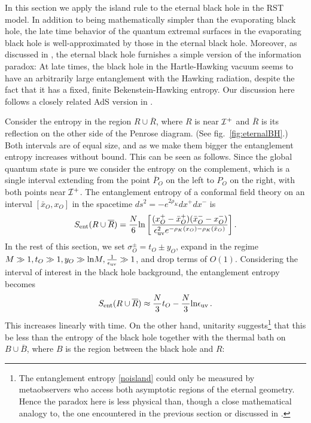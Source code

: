\documentclass[11pt,oneside,letterpaper]{article}
\newcommand{\f}{\frac}
\newcommand{\be}{\begin{equation}}
\newcommand{\ee}{\end{equation}}
\newcommand{\bx}{\bar{x}}
\def\be{\begin{eqnarray}}
\def\ee{\end{eqnarray}}
\let\f=\frac
\def\be{\begin{equation}}
\def\ee{\end{equation}}
\def\euv{\epsilon_{\rm uv}}
\def\log{{\rm ln}}
\numberwithin{equation}{section}
\def \be {\begin{equation}}
\def \ee {\end{equation}}
\begin{document}
In this section we apply the island rule to the eternal black hole in the RST model. In addition to being mathematically simpler than the evaporating black hole, the late time behavior of the quantum extremal surfaces in the evaporating black hole is well-approximated by those in the eternal black hole. 
Moreover, as discussed in \cite{Fiola:1994ir,Strominger:1993yf,Almheiri:2019yqk}, the eternal black hole furnishes a simple version of the information paradox: At late times, the black hole in the Hartle-Hawking vacuum seems to have an arbitrarily large entanglement with the Hawking radiation, despite the fact that it has a fixed, finite Bekenstein-Hawking entropy.  Our discussion here follows a closely related AdS version in \cite{Almheiri:2019yqk}.


Consider the entropy in the region $R \cup \overline{R}$, where $R$ is near ${\cal I}^+$ and $\overline{R}$ is its reflection on the other side of the Penrose diagram. (See fig.~\ref{fig:eternalBH}.) Both intervals are of equal size, and as we make them bigger the entanglement entropy increases without bound. This can be seen as follows. Since the global quantum state is pure we consider the entropy on the complement, which is a single interval extending from the point $\overline{P}_O$ on the left to $P_O$ on the right, with both points near ${\cal I}^+$.  The entanglement entropy of a conformal field theory on an interval $[\bx_O, x_O]$ in the spacetime $ds^2 = -e^{2\rho_K}dx^+ dx^-$ is 
\be\label{srr1}
S_{\rm ent}({R\cup \overline{R}}) = \f N 6 \log \left[\f{(x_O^+-\bx_O^+)(\bx_O^--x_O^-)}{\euv ^2e^{-\rho_K(x_O)-\rho_K(\bx_O)}}\right].
\ee
 In the rest of this section, we set $\sigma_O^{\pm} = t_O \pm y_O$, expand in the regime $M \gg 1, t_O \gg 1, y_O \gg \log M, {1 \over \euv}\gg 1$, and drop terms of $O(1)$.  Considering the interval of interest in the black hole background, the entanglement entropy becomes \be\label{noisland}
S_{\rm ent}({R\cup \overline{R}}) \approx  
\frac{N}{3}t_O  - \frac{N}{3}\log \epsilon_{\rm uv}\,.
\ee
This increases linearly with time. On the other hand, unitarity suggests\footnote{The entanglement entropy  \eqref{noisland} could only be measured by metaobservers who access both asymptotic regions of the eternal geometry. Hence the paradox here is less physical than, though a close mathematical analogy to, the one encountered in the previous section or discussed in  \cite{Fiola:1994ir,Strominger:1993yf}.} that this be  less than  the entropy of the black hole together with the thermal bath on $B \cup \overline{B}$, where $B$ is the region between the black hole and $R$: 
\end{document}
